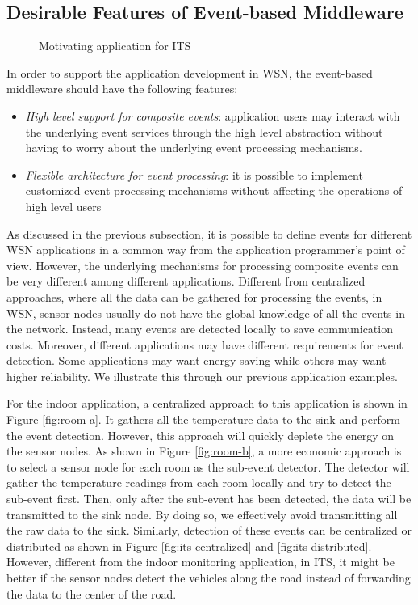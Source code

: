 \subsection{Desirable Features of Event-based Middleware}

\begin{figure}
\centering
{}
\caption{Motivating application for ITS}
\label{fig:its}
\end{figure}

In order to support the application development in WSN, the event-based middleware should have the following features:
\begin{itemize}
\item \emph{High level support for composite events}: application users may interact with the underlying event services through the high level abstraction without having to worry about the underlying event processing mechanisms.
\item \emph{Flexible architecture for event processing}: it is possible to implement customized event processing mechanisms without affecting the operations of high level users
\end{itemize}

As discussed in the previous subsection, it is possible to define events for different WSN applications in a common way from the application programmer's point of view. However, the underlying mechanisms for processing composite events can be very different among different applications. Different from centralized approaches, where all the data can be gathered for processing the events, in WSN, sensor nodes usually do not have the global knowledge of all the events in the network. Instead, many events are detected locally to save communication costs. Moreover, different applications may have different requirements for event detection. Some applications may want energy saving while others may want higher reliability. We illustrate this through our previous application examples.

For the indoor application, a centralized approach to this application is shown in Figure \ref{fig:room-a}. It gathers all the temperature data to the sink and perform the event detection. However, this approach will quickly deplete the energy on the sensor nodes. As shown in Figure \ref{fig:room-b}, a more economic approach is to select a sensor node for each room as the sub-event detector. The detector will gather the temperature readings from each room locally and try to detect the sub-event first. Then, only after the sub-event has been detected, the data will be transmitted to the sink node. By doing so, we effectively avoid transmitting all the raw data to the sink. Similarly, detection of these events can be centralized or distributed as shown in Figure \ref{fig:its-centralized} and \ref{fig:its-distributed}. However, different from the indoor monitoring application, in ITS, it might be better if the sensor nodes detect the vehicles along the road instead of forwarding the data to the center of the road. 

